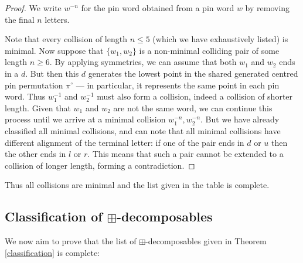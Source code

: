 \documentclass[11pt,a4paper]{article}
\theoremstyle{definition}
\begin{document}
\begin{proof}

We write $w^{-n}$ for the pin word obtained from a pin word $w$ by removing the final $n$ letters.

Note that every collision of length $n \leq 5$ (which we have exhaustively listed) is minimal. Now suppose that $\{w_{1},w_{2}\}$ is a non-minimal colliding pair of some length $n \geq 6$. By applying symmetries, we can assume that both $w_{1}$ and $w_{2}$ ends in a $d$. But then this $d$ generates the lowest point in the shared generated centred pin permutation $\pi^{\circ}$ --- in particular, it represents the same point in each pin word. Thus $w_{1}^{-1}$ and $w_{2}^{-1}$ must also form a collision, indeed a collision of shorter length. Given that $w_{1}$ and $w_{2}$ are not the same word, we can continue this process until we arrive at a minimal collision $w_{1}^{-n},w_{2}^{-n}$. But we have already classified all minimal collisions, and can note that all minimal collisions have different alignment of the terminal letter: if one of the pair ends in $d$ or $u$ then the other ends in $l$ or $r$. This means that such a pair cannot be extended to a collision of longer length, forming a contradiction. \qedhere

\end{proof}

Thus all collisions are minimal and the list given in the table is complete.

\subsection{Classification of $\boxplus$-decomposables}

We now aim to prove that the list of $\boxplus$-decomposables given in Theorem \ref{classification} is complete:
\end{document}
